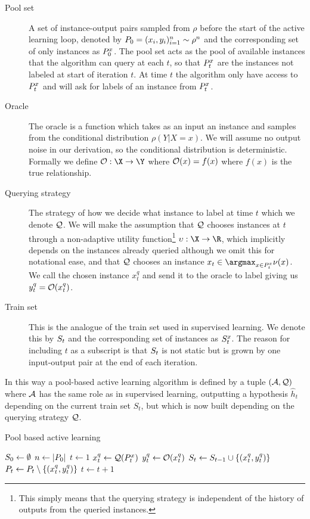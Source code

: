 \begin{description}
\item[{Pool set}] A set of instance-output pairs sampled from \(\rho\) before
the start of the active learning loop, denoted by \(P_{0} = (x_{i},
y_{i})_{i=1}^{n} \sim \rho^{n}\) and the corresponding set of only instances as
\(P^x_{0}\). The pool set acts as the pool of available instances that
the algorithm can query at each \(t\), so that \(P^x_{t}\) are the
instances not labeled at start of iteration \(t\). At time \(t\) the algorithm
only have access to \(P^x_{t}\) and will ask for labels of an instance
from \(P^x_{t}\).
\item[{Oracle}] The oracle is a function which takes as an input an instance and
samples from the conditional distribution \(\rho(Y | X = x)\). We will assume no
output noise in our derivation, so the conditional distribution is
deterministic. Formally we define \(\oracle: \X \to \Y\) where \(\mathcal{O}(x) =
f(x)\) where \(f(x)\) is the true relationship.
\item[{Querying strategy}] The strategy of how we decide what instance to label
at time \(t\) which we denote \(\mathcal{Q}\). We will make the assumption that
\(\mathcal{Q}\) chooses instances at \(t\) through a non-adaptive utility
function\footnote{This simply means that the querying strategy is independent of
the history of outputs from the queried instances.} \(\upsilon: \X \to \R\),
which implicitly depends on the instances already queried although we omit this
for notational ease, and that \(\mathcal{Q}\) chooses an instance \(x_{t} \in
\argmax_{x \in \poolsetx_{t}} \nu(x)\). We call the chosen instance \(x^{q}_{t}\) and send it
to the oracle to label giving us \(y^{q}_{t} = \mathcal{O}(x^{q}_{t})\).
\item[{Train set}] This is the analogue of the train set used in supervised
learning. We denote this by \(S_{t}\) and the corresponding set of
instances as \(S^x_{t}\). The reason for including \(t\) as a subscript
is that \(S_{t}\) is not static but is grown by one input-output pair at
the end of each iteration.
\end{description}

In this way a pool-based active learning algorithm is defined by a tuple
\((\mathcal{A}, \mathcal{Q})\) where \(\mathcal{A}\) has the same role as in supervised
learning, outputting a hypothesis \(\hat{h}_{t}\) depending on the current train
set \(S_{t}\), but which is now built depending on the querying strategy
\(\mathcal{Q}\).
\begin{algorithm}
  \caption{Pool based active learning}\label{alg:active-learning}
  \begin{algorithmic}[1]  \State $S_0 \gets \emptyset$ \State $n \gets
|P_{0}|$ \State $t \gets 1$  \State $x^q_t \gets
\mathcal{Q}(P^x_{t})$ \State $y^q_t \gets \mathcal{O}(x^q_t)$ \State
$S_{t} \gets S_{t-1} \cup \{(x^q_t, y^q_t)\}$ \State $P_t
\gets P_t \setminus \{(x^q_t, y^q_t)\}$ \State $t \gets t + 1$ \EndWhile
\EndProcedure
  \end{algorithmic}
\end{algorithm}

